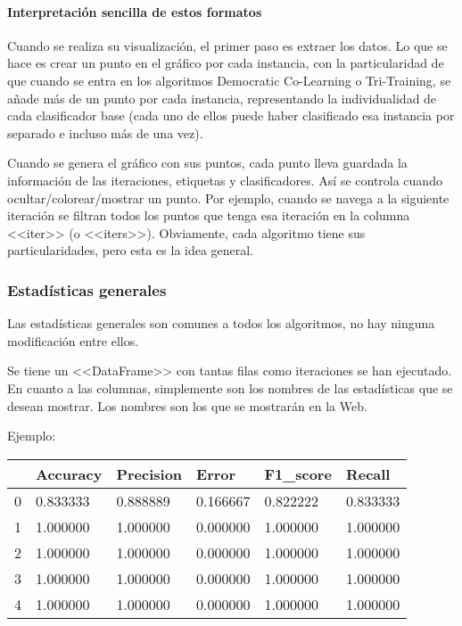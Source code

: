 \paragraph{Interpretación sencilla de estos formatos} Cuando se realiza su
visualización, el primer paso es extraer los datos. Lo que se hace es crear un
punto en el gráfico por cada instancia, con la particularidad de que cuando se
entra en los algoritmos Democratic Co-Learning o Tri-Training, se añade más de
un punto por cada instancia, representando la individualidad de cada
clasificador base (cada uno de ellos puede haber clasificado esa instancia por
separado e incluso más de una vez).

Cuando se genera el gráfico con sus puntos, cada punto lleva guardada la
información de las iteraciones, etiquetas y clasificadores. Así se controla
cuando ocultar/colorear/mostrar un punto. Por ejemplo, cuando se navega a la
siguiente iteración se filtran todos los puntos que tenga esa iteración en la
columna <<iter>> (o <<iters>>). Obviamente, cada algoritmo tiene sus
particularidades, pero esta es la idea general.

\subsubsection{Estadísticas generales}
Las estadísticas generales son comunes a todos los algoritmos, no hay ninguna
modificación entre ellos.

Se tiene un <<DataFrame>> con tantas filas como iteraciones se han ejecutado. En
cuanto a las columnas, simplemente son los nombres de las estadísticas que se
desean mostrar. Los nombres son los que se mostrarán en la Web.

Ejemplo:
\begin{table}[H]
\begin{tabular}{llllll}
  & Accuracy  & Precision & Error    & F1\_score & Recall    \\ \hline
0 & 0.833333  & 0.888889  & 0.166667 & 0.822222  & 0.833333  \\
1 & 1.000000 & 1.000000 & 0.000000 & 1.000000 & 1.000000 \\
2 & 1.000000 & 1.000000 & 0.000000 & 1.000000 & 1.000000 \\
3 & 1.000000 & 1.000000 & 0.000000 & 1.000000 & 1.000000 \\
4 & 1.000000 & 1.000000 & 0.000000 & 1.000000 & 1.000000
\end{tabular}
\end{table}

